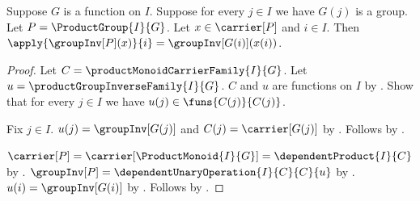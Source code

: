 \begin{proposition}\label{product_group_inverse_coordinate}
    Suppose $G$ is a function on $I$.
    Suppose for every $j\in I$ we have $G(j)$ is a group.
    Let $P=\ProductGroup{I}{G}$.
    Let $x\in\carrier[P]$ and $i\in I$.
    Then $\apply{\groupInv[P](x)}{i}=\groupInv[G(i)](x(i))$.
\end{proposition}
\begin{proof}
    Let $C=\productMonoidCarrierFamily{I}{G}$.
    Let $u=\productGroupInverseFamily{I}{G}$.
    $C$ and $u$ are functions on $I$ by
        .
    Show that for every $j\in I$ we have
        $u(j)\in\funs{C(j)}{C(j)}$.
    \begin{subproof}
        Fix $j\in I$.
        $u(j)=\groupInv[G(j)]$ and $C(j)=\carrier[G(j)]$ by
            .
        Follows by .
    \end{subproof}
    $\carrier[P]=\carrier[\ProductMonoid{I}{G}]
        =\dependentProduct{I}{C}$ by
        .
    $\groupInv[P]=\dependentUnaryOperation{I}{C}{C}{u}$ by
        .
    $u(i)=\groupInv[G(i)]$ by
        .
    Follows by .
\end{proof}

